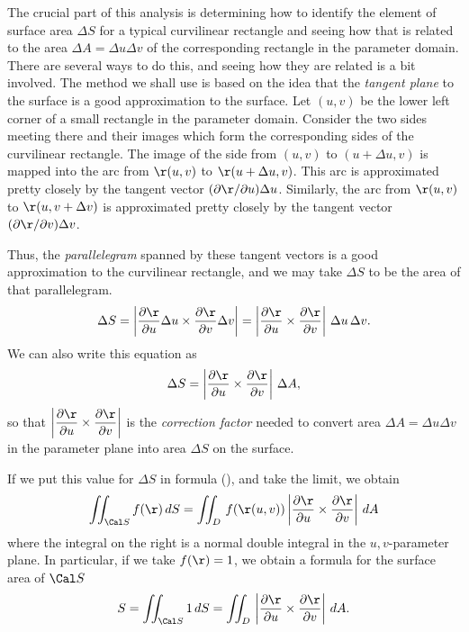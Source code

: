 The crucial part of this analysis is determining how to identify
the element of surface area $\Delta S$ for a typical
curvilinear rectangle and seeing how that
is related to the area 
$\Delta A = \Delta u\Delta v$ of the corresponding rectangle in the
parameter domain.   There are several
ways to do this, and seeing how they are related is a bit involved.
The method we shall use is based on the idea that the {\it tangent
plane\/} to the surface is a good approximation to the
surface.  Let  $(u,v)$ be the lower left corner
of a small rectangle in the parameter domain. Consider the
two sides meeting there and their images which form the
corresponding sides of the curvilinear rectangle.  
The image of the side  from $(u,v)$ to $(u+\Delta u, v)$
 is mapped  into the arc
 from $\r(u,v)$ to $\r(u+\Delta u, v)$.  
This arc is approximated pretty closely by the tangent
 vector $(\partial \r/\partial u)\Delta u$. 
 Similarly, the arc from $\r(u,v)$ to $\r(u,v + \Delta v)$
is approximated pretty closely by the tangent 
vector $(\partial \r/\partial v)\Delta v$.
\medskip
\centerline{}
\medskip
Thus, the {\it parallelegram\/} spanned by these tangent
vectors is a good approximation to the curvilinear rectangle,
and we may take 
$\Delta S$ to be the area of that  parallelegram.
$$
  \Delta S = \left|\frac{\partial\r}{\partial u}\Delta u\times  
\frac{\partial\r}{\partial v}\Delta v\right| =
\left|\frac{\partial\r}{\partial u}\times  
\frac{\partial\r}{\partial v}\right| \,\Delta u\,\Delta v.
$$
We can also write this equation as
$$
  \Delta S = 
\left|\frac{\partial\r}{\partial u}\times  
\frac{\partial\r}{\partial v}\right| \,\Delta A,
$$
so that
$\displaystyle{\left|\frac{\partial\r}{\partial u}\times  
\frac{\partial\r}{\partial v}\right|}$ is the {\it correction factor\/}
needed to convert area $\Delta A = \Delta u\Delta v$
in the parameter plane into area $\Delta S$ on the
surface.

If we put this value for $\Delta S$ in formula (\SumEq), and take the
limit, we obtain
$$
  \iint_{\Cal S}f(\r)\,dS = \iint_D\,f(\r(u,v))
\left|\frac{\partial\r}{\partial u}\times\frac{\partial\r}{\partial v}\right|
\,dA
$$
%
where the integral on the right is a normal double integral in the
$u,v$-parameter plane.  In particular, if we take $f(\r) = 1$,
we obtain a formula for the surface area of $\Cal S$
$$
  S = \iint_{\Cal S}1\,dS = \iint_D\,
\left|\frac{\partial\r}{\partial u}\times\frac{\partial\r}{\partial v}\right|
\,dA.
$$
%

